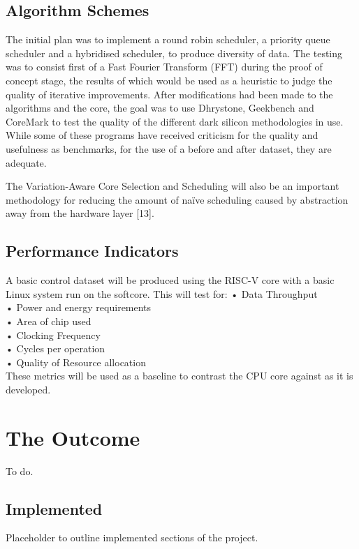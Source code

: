 	\subsection{Algorithm Schemes}	
		The initial plan was to implement a round robin scheduler, a priority queue scheduler and a hybridised scheduler, to produce diversity of data. The testing was to consist first of a Fast Fourier Transform (FFT) during the proof of concept stage, the results of which would be used as a heuristic to judge the quality of iterative improvements. After modifications had been made to the algorithms and the core, the goal was to use Dhrystone, Geekbench and CoreMark to test the quality of the different dark silicon methodologies in use.\\
		While some of these programs have received criticism for the quality and usefulness as benchmarks, for the use of a before and after dataset, they are adequate.
	
	The Variation-Aware Core Selection and Scheduling will also be an important methodology for reducing the amount of naïve scheduling caused by abstraction away from the hardware layer [13].
	
	\subsection{Performance Indicators}
	A basic control dataset will be produced using the RISC-V core with a basic Linux system run on the softcore. This will test for:
	• Data Throughput\\
	• Power and energy requirements\\
	• Area of chip used \\
	• Clocking Frequency\\
	• Cycles per operation\\
	• Quality of Resource allocation\\
	These metrics will be used as a baseline to contrast the CPU core against as it is developed.\\
	
\section{The Outcome}
	To do.
	
	\subsection{Implemented}
	Placeholder to outline implemented sections of the project.
	
